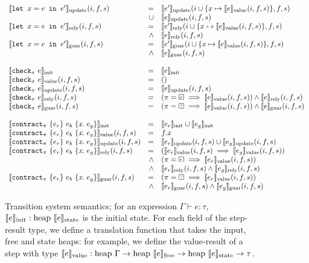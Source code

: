 \documentclass[a4paper,UKenglish,cleveref, autoref, thm-restate,anonymous]{lipics-v2021}
\begin{document}
\begin{figure}
\[\begin{array}{lrl}
    \sysupdate{\xlet{x}{e}{e'}}(i, f, s) & = & \sysupdate{e'}(i \cup \{ x \mapsto \sysvalue{e}(i, f, s)\}, f, s) \\
      & \cup & \sysupdate{e}(i, f, s) \\
    \sysrely{\xlet{x}{e}{e'}}(i, f, s) & = & \sysrely{e'}(i \cup \{ x \mapsto \sysvalue{e}(i, f, s)\}, f, s) \\
      & \wedge & \sysrely{e}(i, f, s) \\
    \sysguar{\xlet{x}{e}{e'}}(i, f, s) & = & \sysguar{e'}(i \cup \{ x \mapsto \sysvalue{e}(i, f, s)\}, f, s) \\
      & \wedge & \sysguar{e}(i, f, s) \\
    \\
    \sysinit{\xcheckP{\PStatus}{e}} & = & \sysinit{e} \\
    \sysvalue{\xcheckP{\PStatus}{e}}(i, f, s) & = & () \\
    \sysupdate{\xcheckP{\PStatus}{e}}(i, f, s) & = & \sysupdate{e}(i, f, s) \\
    \sysrely{\xcheckP{\PStatus}{e}}(i, f, s) & = & (\PStatus = \PSValid \implies \sysvalue{e}(i, f, s)) \wedge \sysrely{e}(i, f, s) \\
    \sysguar{\xcheckP{\PStatus}{e}}(i, f, s) & = & (\PStatus = \PSUnknown \implies \sysvalue{e}(i, f, s)) \wedge \sysguar{e}(i, f, s) \\
    \\
    \sysinit{\xctr} & = & \sysinit{e_r} \cup \sysinit{e_g} \\
    \sysvalue{\xctr}(i, f, s) & = & f.x \\
    \sysupdate{\xctr}(i, f, s) & = & \sysupdate{e_r}(i, f, s) \cup \sysupdate{e_g}(i, f, s) \\
    \sysrely{\xctr}(i, f, s) & = & (\sysvalue{e_r}(i, f, s) \implies \sysvalue{e_g}(i, f, s)) \\
                            & \wedge & (\PStatus = \PSValid \implies \sysvalue{e_r}(i, f, s)) \\
                            & \wedge & \sysrely{e_r}(i, f, s) \wedge \sysrely{e_g}(i, f, s) \\
    \sysguar{\xctr}(i, f, s) & = & (\PStatus = \PSUnknown \implies \sysvalue{e_r}(i, f, s)) \\
    & \wedge & \sysguar{e_r}(i, f, s) \wedge \sysguar{e_g}(i, f, s) \\
\end{array}
  \]
  \caption{Transition system semantics; for an expression $\Gamma \vdash e: \tau$, $\llbracket e \rrbracket_{\text{init}} : \text{heap~}\llbracket e \rrbracket_{\text{state}}$ is the initial state. For each field of the step-result type, we define a translation function that takes the input, free and state heaps: for example, we define the value-result of a step with type $\llbracket e \rrbracket_{\text{value}}: \text{heap~}\Gamma \to \text{heap~}\llbracket e \rrbracket_{\text{free}} \to \text{heap~}\llbracket e \rrbracket_{\text{state}} \to \tau$.}
  \label{f:system-translation}
\end{figure} 
\end{document}
